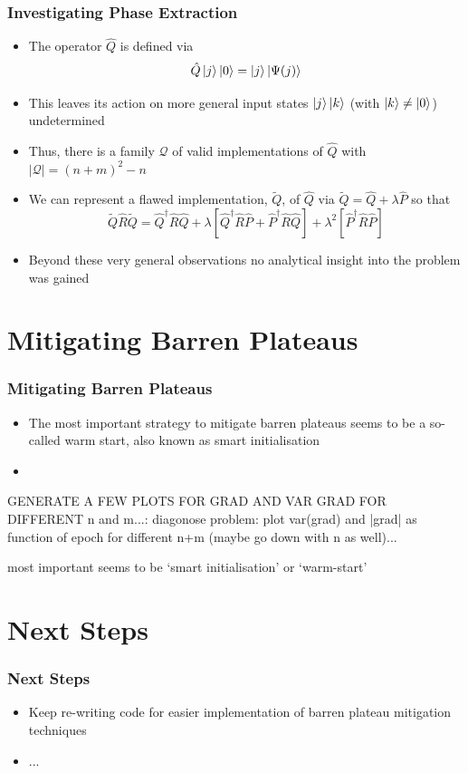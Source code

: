 \documentclass{beamer}
\begin{document}
\begin{frame}
\frametitle{Investigating Phase Extraction}
\begin{itemize}
\item The operator $\hat{Q}$ is defined via 
\begin{equation}
\hat{Q} \ket{j} \ket{0} = \ket{j} \ket{\Psi(j)}
\end{equation}
\item This leaves its action on more general input states $\ket{j}\ket{k}$ (with $\ket{k} \neq \ket{0}$) \alert{undetermined} 
\item Thus, there is a \alert{family} $\mathcal{Q}$ of valid implementations of $\hat{Q}$ with $|\mathcal{Q}|=(n+m)^2 -n$ 
\item We can represent a flawed implementation, $\tilde{Q}$, of $\hat{Q}$ via $\tilde{Q} = \hat{Q} + \lambda \hat{P}$ so that 
\begin{equation}
\tilde{Q}\hat{R} \tilde{Q} = \hat{Q}^\dagger \hat{R} \hat{Q} + \lambda \left[ \hat{Q}^\dagger  \hat{R} \hat{P} + \hat{P}^\dagger \hat{R} \hat{Q}\right] + \lambda^2 \left[ \hat{P}^\dagger \hat{R} \hat{P} \right]
\end{equation}
\item Beyond these very general observations \alert{no analytical insight into the problem was gained}
\end{itemize}
\end{frame}

\section{Mitigating Barren Plateaus}

\begin{frame}
\frametitle{Mitigating Barren Plateaus}
\begin{itemize}
\item The most important strategy to mitigate barren plateaus seems to be a so-called \alert{warm start}, also known as \alert{smart initialisation}
\item 
\end{itemize}

GENERATE A FEW PLOTS FOR GRAD AND VAR GRAD FOR DIFFERENT n and m...: diagonose problem: plot var(grad) and |grad| as function of epoch for different n+m (maybe go down with n  as well)...



most important seems to be `smart initialisation' or `warm-start'

\end{frame}



\section{Next Steps}

\begin{frame}
\frametitle{Next Steps}
\begin{itemize}
\item Keep re-writing code for easier implementation of barren plateau mitigation techniques
\item ...
\end{itemize}
\end{frame}
\end{document}
